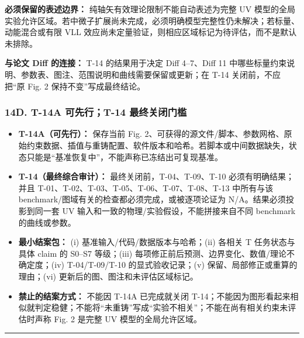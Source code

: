 \documentclass[
]{article}
\providecommand{\tightlist}{%
  \setlength{\itemsep}{0pt}\setlength{\parskip}{0pt}}
\begin{document}
\textbf{必须保留的表述边界：} 纯轴矢有效理论限制不能自动表述为完整 UV
模型的全局实验允许区域。若中微子扩展尚未完成，必须明确模型完整性仍未解决；若标量、动能混合或有限
VLL 效应尚未定量验证，则相应区域标记为待评估，而不是默认未排除。

\textbf{与论文 Diff 的连接：} T-14 的结果用于决定 Diff 4--7、Diff 11
中哪些标量约束说明、参数表、图注、范围说明和曲线需要保留或更新；在 T-14
关闭前，不应把``原 Fig. 2 保持不变''写成最终结论。

\subsubsection{14D. T-14A 可先行；T-14
最终关闭门槛}\label{d.-t-14a-ux53efux5148ux884ct-14-ux6700ux7ec8ux5173ux95edux95e8ux69db}

\begin{itemize}
\tightlist
\item
  \textbf{T-14A（可先行）：} 保存当前 Fig.
  2、可获得的源文件/脚本、参数网格、原始约束数据、插值与重铸配置、软件版本和哈希。若脚本或中间数据缺失，状态只能是``基准恢复中''，不能声称已冻结出可复现基准。
\item
  \textbf{T-14（最终综合审计）：} 最终关闭前，T-04、T-09、T-10
  必须有明确结果；并且 T-01、T-02、T-03、T-05、T-06、T-07、T-08、T-13
  中所有与该 benchmark/图域有关的检查都必须完成，或被逐项论证为
  N/A。结果必须投影到同一套 UV
  输入和一致的物理/实验假设，不能拼接来自不同 benchmark 的曲线或参数。
\item
  \textbf{最小结案包：} (i) 基准输入/代码/数据版本与哈希；(ii) 各相关 T
  任务状态与具体 claim 的 S0--S7 等级；(iii)
  每项修正前后预测、边界变化、数值/理论不确定度；(iv) T-04/T-09/T-10
  的显式验收记录；(v) 保留、局部修正或重算的理由；(vi)
  更新后的图、图注和未评估区域标记。
\item
  \textbf{禁止的结案方式：} 不能因 T-14A 已完成就关闭
  T-14；不能因为图形看起来相似就判定稳健；不能将``未重铸''写成``实验不相关''；不能在尚有相关约束未评估时声称
  Fig. 2 是完整 UV 模型的全局允许区域。
\end{itemize}

\begin{center}\rule{0.5\linewidth}{0.5pt}\end{center}
\end{document}
